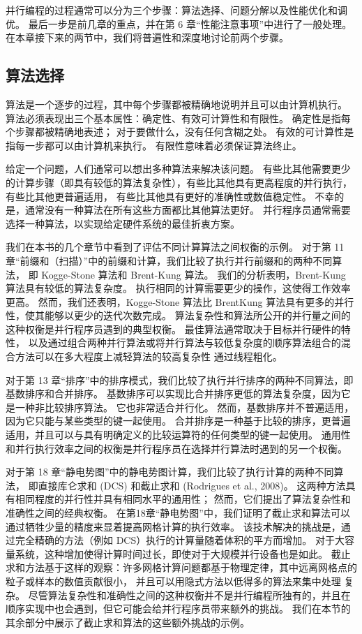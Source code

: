 并行编程的过程通常可以分为三个步骤：算法选择、问题分解以及性能优化和调优。 
最后一步是前几章的重点，并在第 6 章“性能注意事项”中进行了一般处理。 
在本章接下来的两节中，我们将普遍性和深度地讨论前两个步骤。

\subsection{算法选择}
算法是一个逐步的过程，其中每个步骤都被精确地说明并且可以由计算机执行。 
算法必须表现出三个基本属性：确定性、有效可计算性和有限性。 
确定性是指每个步骤都被精确地表述； 对于要做什么，没有任何含糊之处。 
有效的可计算性是指每一步都可以由计算机来执行。 有限性意味着必须保证算法终止。

给定一个问题，人们通常可以想出多种算法来解决该问题。 
有些比其他需要更少的计算步骤（即具有较低的算法复杂性），有些比其他具有更高程度的并行执行，有些比其他更普遍适用，
有些比其他具有更好的准确性或数值稳定性。 不幸的是，通常没有一种算法在所有这些方面都比其他算法更好。 
并行程序员通常需要选择一种算法，以实现给定硬件系统的最佳折衷方案。

我们在本书的几个章节中看到了评估不同计算算法之间权衡的示例。 
对于第 11 章“前缀和（扫描）”中的前缀和计算，我们比较了执行并行前缀和的两种不同算法，
即 Kogge-Stone 算法和 Brent-Kung 算法。 我们的分析表明，Brent-Kung 算法具有较低的算法复杂度。 
执行相同的计算需要更少的操作，这使得工作效率更高。 
然而，我们还表明，Kogge-Stone 算法比 BrentKung 算法具有更多的并行性，使其能够以更少的迭代次数完成。 
算法复杂性和算法所公开的并行量之间的这种权衡是并行程序员遇到的典型权衡。 
最佳算法通常取决于目标并行硬件的特性，
以及通过组合两种并行算法或将并行算法与较低复杂度的顺序算法组合的混合方法可以在多大程度上减轻算法的较高复杂性 通过线程粗化。

对于第 13 章“排序”中的排序模式，我们比较了执行并行排序的两种不同算法，即基数排序和合并排序。 
基数排序可以实现比合并排序更低的算法复杂度，因为它是一种非比较排序算法。 它也非常适合并行化。 
然而，基数排序并不普遍适用，因为它只能与某些类型的键一起使用。 
合并排序是一种基于比较的排序，更普遍适用，并且可以与具有明确定义的比较运算符的任何类型的键一起使用。 
通用性和并行执行效率之间的权衡是并行程序员在选择并行算法时遇到的另一个权衡。

对于第 18 章“静电势图”中的静电势图计算，我们比较了执行计算的两种不同算法，
即直接库仑求和 (DCS) 和截止求和 (Rodrigues et al., 2008)。 
这两种方法具有相同程度的并行性并具有相同水平的通用性； 然而，它们提出了算法复杂性和准确性之间的经典权衡。 
在第18章“静电势图”中，我们证明了截止求和算法可以通过牺牲少量的精度来显着提高网格计算的执行效率。 
该技术解决的挑战是，通过完全精确的方法（例如 DCS）执行的计算量随着体积的平方而增加。 
对于大容量系统，这种增加使得计算时间过长，即使对于大规模并行设备也是如此。 
截止求和方法基于这样的观察：许多网格计算问题都基于物理定律，其中远离网格点的粒子或样本的数值贡献很小，
并且可以用隐式方法以低得多的算法来集中处理 复杂。 
尽管算法复杂性和准确性之间的这种权衡并不是并行编程所独有的，并且在顺序实现中也会遇到，但它可能会给并行程序员带来额外的挑战。 
我们在本节的其余部分中展示了截止求和算法的这些额外挑战的示例。

